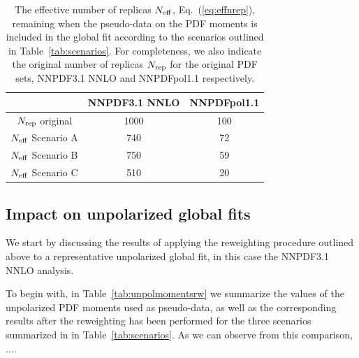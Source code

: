 \begin{table}[t]
  \centering
  \begin{tabular}{c|c|c}
    \hline
    &  NNPDF3.1 NNLO  &  NNPDFpol1.1 \\
    \hline
    \hline
    $N_{\rm rep}$ original   &   1000 &  100   \\
    \hline
     $N_{\rm eff}$ Scenario A    &   740  &  72   \\
     $N_{\rm eff}$ Scenario B    &   750   &   59  \\
     $N_{\rm eff}$ Scenario C   &   510  &   20  \\
    \hline
  \end{tabular}
  \caption{\small The effective number of replicas
    $N_{\rm eff}$, Eq.~(\ref{eq:effnrep}), remaining when the pseudo-data
    on the PDF moments is included in the global
    fit according to the scenarios outlined
    in Table~\ref{tab:scenarios}.
    For completeness, we also indicate the original number
    of replicas $N_{\rm rep}$ for the original
    PDF sets, NNPDF3.1 NNLO and NNPDFpol1.1 respectively.
    \label{tab:neff}
  }
\end{table}

\subsection{Impact on unpolarized global fits}
%
We start by discussing the results of applying the reweighting procedure
outlined above to a representative unpolarized
global fit, in this case the NNPDF3.1 NNLO analysis.

To begin with, in Table~\ref{tab:unpolmomentsrw} we summarize
the values of the unpolarized PDF moments
  used as pseudo-data, as well as the corresponding results
  after the reweighting has been performed for the
three scenarios summarized in 
in Table~\ref{tab:scenarios}.
%
As we can observe from this comparison, ....

